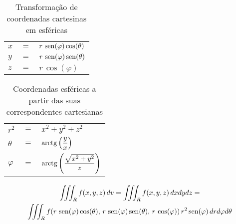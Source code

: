 	\begin{table}[H]
		\caption{Transformação de coordenadas cartesinas em esféricas}
		\label{transformacao_coordenadas_cartesianas_esfericas}
		\centering		
		\begin{tabular}{|lcl|}
			$x$ & $=$ & $r\,\operatorname{sen}(\varphi)\cos(\theta)$ \\
			$y$ & $=$ & $r\,\operatorname{sen}(\varphi)\operatorname{sen}(\theta)$ \\
			$z$ & $=$ & $r\,\cos(\varphi)$
		\end{tabular}		
	\end{table}	
	\begin{table}[H]
		\caption{Coordenadas esféricas a partir das suas correspondentes cartesianas}
		\label{correpondentes_coordenadas_cartesianas_esfericas}
		\centering		
		\begin{tabular}{|lcl|}
			$r^2$     & $=$ & $x^2 + y^2 + z^2$                                \\
			$\theta$  & $=$ & $\operatorname{arctg}\left(\dfrac{y}{x}\right)$                \\
			$\varphi$ & $=$ & $\operatorname{arctg}\left(\dfrac{\sqrt{x^2 + y^2}}{z}\right)$
		\end{tabular}		
	\end{table}
	
	\begin{gather*}
		\iiint_R f(x,y,z)\, dv =\iiint_R f(x,y,z)\, dxdydz =\\ \iiint_R f(r\,\operatorname{sen}(\varphi)\cos(\theta),\, r\,\operatorname{sen}(\varphi)\operatorname{sen}(\theta),\, r\,\cos(\varphi))\, r^2\operatorname{sen}(\varphi)\, dr d\varphi d\theta
	\end{gather*}